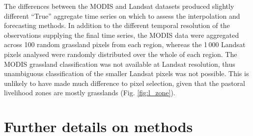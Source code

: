\documentclass[review]{elsarticle}
\begin{document}
The differences between the MODIS and Landsat datasets produced slightly different “True” aggregate time series on which to assess the interpolation and forecasting methods. In addition to the different temporal resolution of the observations supplying the final time series, the MODIS data were aggregated across 100 random grassland pixels from each region, whereas the 1\,000 Landsat pixels analysed were randomly distributed over the whole of each region.  The MODIS grassland classification was not available at Landsat resolution, thus unambiguous classification of the smaller Landsat pixels was not possible. This is unlikely to have made much difference to pixel selection, given that the pastoral livelihood zones are mostly grasslands (Fig. \ref{fig:l_zone}). 

\section{Further details on methods}

\end{document}
